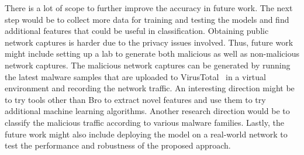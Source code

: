 There is a lot of scope to further improve the accuracy in future work. The next step would be to collect more data for training and testing the models and find additional features that could be useful in classification. Obtaining public network captures is harder due to the privacy issues involved. Thus, future work might include setting up a lab to generate both malicious as well as non-malicious network captures. The malicious network captures can be generated by running the latest malware samples that are uploaded to VirusTotal~\cite{VirusTotal} in a virtual environment and recording the network traffic. An interesting direction might be to try tools other than Bro to extract novel features and use them to try additional machine learning algorithms. Another research direction would be to classify the malicious traffic according to various malware families. Lastly, the future work might also include deploying the model on a real-world network to test the performance and robustness of the proposed approach.